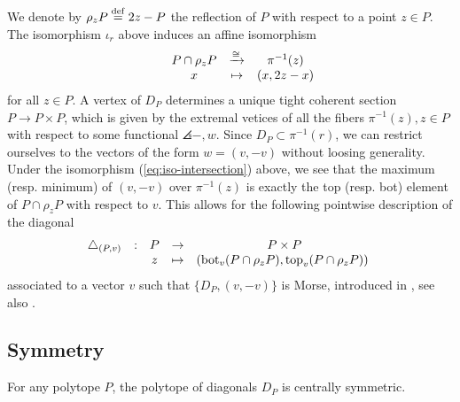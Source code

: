 We denote by $\rho_z P \stackrel{\mathrm{def}}{=} 2z-P$ the reflection of $P$ with respect to a point $z \in P$.
The isomorphism $\iota_r$ above induces an affine isomorphism
\begin{equation}
\label{eq:iso-intersection}
	\begin{matrix}
		& & P \cap \rho_z P & \xrightarrow{\cong} & \pi^{-1}(z) \\
		& & x & \mapsto & (x,2z-x)
	\end{matrix}
\end{equation}
for all $z \in P$.
A vertex of $D_P$ determines a unique tight coherent section $P \to P \times P$, which is given by the extremal vetices of all the fibers $\pi^{-1}(z), z \in P$ with respect to some functional $\angles{-,w}$.
Since $D_P \subset \pi^{-1}(r)$, we can restrict ourselves to the vectors of the form $w=(v,-v)$ without loosing generality.
Under the isomorphism (\ref{eq:iso-intersection}) above, we see that the maximum (resp. minimum) of $(v,-v)$ over $\pi^{-1}(z)$ is exactly the top (resp. bot) element of $P\cap \rho_z P$ with respect to $v$.
This allows for the following pointwise description of the diagonal
\begin{equation*}
	\begin{matrix}
		\triangle_{(P,v)} & : & P & \to & P \times P \\
		& & z & \mapsto & (\bm_v(P \cap \rho_z P),\tp_v(P \cap \rho_z P)) \ 
	\end{matrix}
\end{equation*}
associated to a vector $v$ such that $\{D_P, (v,-v)\}$ is Morse, introduced in \cite[Definition 10]{MTTV19}, see also \cite[Proposition 1.15]{GLA21}.


\subsection{Symmetry}

\begin{lemma}
	For any polytope $P$, the polytope of diagonals $D_P$ is centrally symmetric.
\end{lemma}

